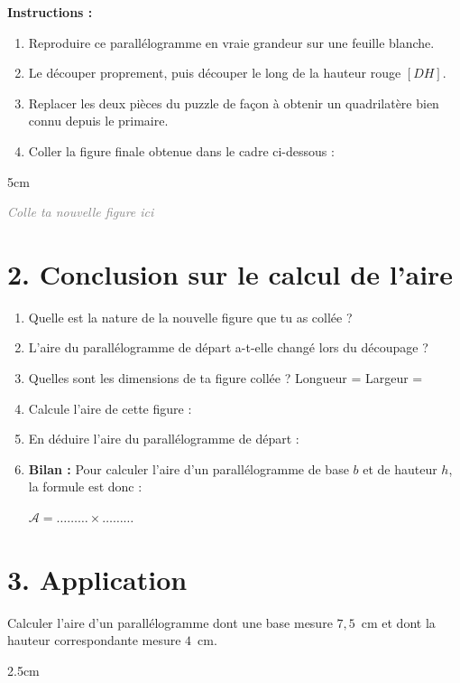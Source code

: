 \documentclass[a4paper]{book}
\begin{document}
    \begin{minipage}[t]{0.52\textwidth}
        \textbf{Instructions :}
        \begin{enumerate}[leftmargin=*, label=\textbf{\arabic*/}]
            \item Reproduire ce parallélogramme en vraie grandeur sur une feuille blanche.
            \item Le découper proprement, puis découper le long de la hauteur rouge $[DH]$.
            \item Replacer les deux pièces du puzzle de façon à obtenir un quadrilatère bien connu depuis le primaire.
            \item Coller la figure finale obtenue dans le cadre ci-dessous :
        \end{enumerate}
        \vspace{0.2cm}
        \begin{ZoneReponse}{5cm}
            \vspace{2.2cm}
            \begin{center}
                \textcolor{gray}{\textit{Colle ta nouvelle figure ici}}
            \end{center}
        \end{ZoneReponse}
    \end{minipage}
    
    
\section*{2. Conclusion sur le calcul de l'aire}
    \begin{enumerate}[leftmargin=*, label=\textbf{\arabic*/}, itemsep=0.2cm]
        \item Quelle est la nature de la nouvelle figure que tu as collée ? \dotfill
        \item L'aire du parallélogramme de départ a-t-elle changé lors du découpage ? \dotfill
        \item Quelles sont les dimensions de ta figure collée ? \quad Longueur = \dotfill \quad Largeur = \dotfill
        \item Calcule l'aire de cette figure : \dotfill
        \item En déduire l'aire du parallélogramme de départ : \dotfill
        \item \textbf{Bilan :} Pour calculer l'aire d'un parallélogramme de base $b$ et de hauteur $h$, la formule est donc :
        \begin{center}
            \Large $\mathcal{A} = \dots\dots\dots \times \dots\dots\dots$
        \end{center}
    \end{enumerate}
    
\section*{3. Application}
    
    \begin{exercice}
        Calculer l'aire d'un parallélogramme dont une base mesure $7,5$~cm et dont la hauteur correspondante mesure $4$~cm.
        \begin{ZoneReponse}{2.5cm}
        \end{ZoneReponse}
    \end{exercice}
\end{document}

